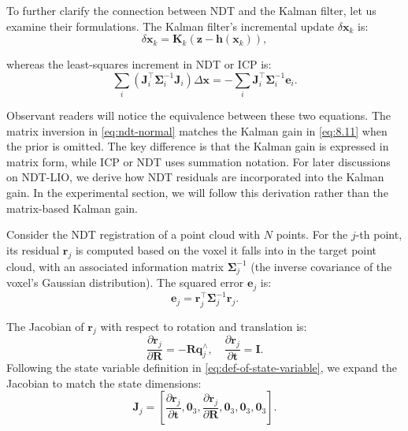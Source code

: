 To further clarify the connection between NDT and the Kalman filter, let us examine their formulations. The Kalman filter's incremental update \(\delta \bm{x}_k\) is:  
\begin{equation}\label{eq:kalman-delta-x}  
	\delta \bm{x}_k = \bm{K}_k (\bm{z} - \bm{h}(\bm{x}_k)),  
\end{equation}  

whereas the least-squares increment in NDT or ICP is:  
\begin{equation}\label{eq:ndt-normal}  
	\sum_{i} (\bm{J}_i^\top \boldsymbol{\Sigma}_i^{-1} \bm{J}_i) \Delta \bm{x} = -\sum_{i} \bm{J}_i^\top \boldsymbol{\Sigma}^{-1}_i \bm{e}_i.  
\end{equation}  

Observant readers will notice the equivalence between these two equations. The matrix inversion in \eqref{eq:ndt-normal} matches the Kalman gain in \eqref{eq:8.11} when the prior is omitted. The key difference is that the Kalman gain is expressed in matrix form, while ICP or NDT uses summation notation. For later discussions on NDT-LIO, we derive how NDT residuals are incorporated into the Kalman gain. In the experimental section, we will follow this derivation rather than the matrix-based Kalman gain.  

Consider the NDT registration of a point cloud with \( N \) points. For the \( j \)-th point, its residual \(\bm{r}_j\) is computed based on the voxel it falls into in the target point cloud, with an associated information matrix \(\boldsymbol{\Sigma}^{-1}_j\) (the inverse covariance of the voxel's Gaussian distribution). The squared error \(\bm{e}_j\) is:  
\begin{equation}\label{key}  
	\bm{e}_j = \bm{r}_j^\top \boldsymbol{\Sigma}^{-1}_j \bm{r}_j.  
\end{equation}  

The Jacobian of \(\bm{r}_j\) with respect to rotation and translation is:  
\begin{equation}\label{key}  
	\frac{\partial \bm{r}_j}{\partial \bm{R}} = -\bm{R} \bm{q}_j^\wedge, \quad \frac{\partial \bm{r}_j}{\partial \bm{t}} = \bm{I}.  
\end{equation}  
Following the state variable definition in \eqref{eq:def-of-state-variable}, we expand the Jacobian to match the state dimensions:  
\begin{equation}\label{key}  
	\bm{J}_j = \left[\frac{\partial \bm{r}_j}{\partial \bm{t}}, \bm{0}_{3}, \frac{\partial \bm{r}_j}{\partial \bm{R}}, \bm{0}_3, \bm{0}_3, \bm{0}_3 \right].  
\end{equation}  

